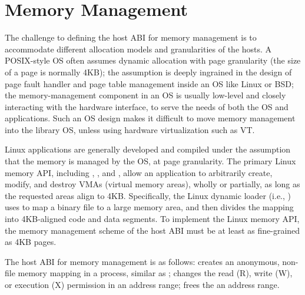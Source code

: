 \section{Memory Management}
\label{sec:abi:memory}


The challenge to defining the host ABI for memory management
is to accommodate different allocation models and granularities of the hosts.
A POSIX-style OS often assumes dynamic allocation with page granularity (the size of a page is normally 4KB);
the assumption is deeply ingrained in the design of page fault handler and page table management
inside an OS like Linux or BSD;
the memory-management component in an OS
is usually low-level and closely interacting with the hardware interface,
to serve the needs of both the OS and applications.
Such an OS design makes it difficult to move memory management
into the library OS, unless using hardware virtualization such as VT.



Linux applications 
are generally developed and compiled under the assumption that the memory is managed
by the OS,
at page granularity.
The primary Linux memory API,
including , , and ,
allow an application
to arbitrarily create, modify, and destroy VMAs (virtual memory areas),
wholly or partially,
as long as the requested areas align to
4KB.
Specifically, the Linux dynamic loader (i.e., ) %
uses  to map a binary file to a large memory area,
and then divides the mapping into 4KB-aligned code and data segments.
To implement the Linux memory API,
the memory management scheme of the host ABI
must be at least as fine-grained as 4KB pages.


The host ABI for memory management is as follows:
 creates an anonymous, non-file memory mapping in a process, similar as ;
 changes the read (R), write (W), or execution (X) permission in an address range;
 frees the an address range.




